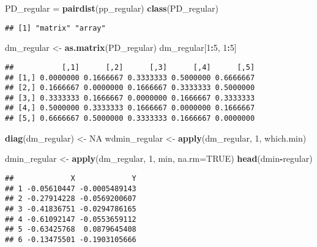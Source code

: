 \documentclass[
]{book}
\newenvironment{Shaded}{\begin{snugshade}}{\end{snugshade}}
\newcommand{\DataTypeTok}[1]{\textcolor[rgb]{0.13,0.29,0.53}{#1}}
\newcommand{\DecValTok}[1]{\textcolor[rgb]{0.00,0.00,0.81}{#1}}
\newcommand{\KeywordTok}[1]{\textcolor[rgb]{0.13,0.29,0.53}{\textbf{#1}}}
\newcommand{\NormalTok}[1]{#1}
\newcommand{\OperatorTok}[1]{\textcolor[rgb]{0.81,0.36,0.00}{\textbf{#1}}}
\newcommand{\OtherTok}[1]{\textcolor[rgb]{0.56,0.35,0.01}{#1}}
\newcommand{\StringTok}[1]{\textcolor[rgb]{0.31,0.60,0.02}{#1}}
\begin{document}
\begin{Shaded}
\begin{Highlighting}[]
\NormalTok{PD_regular =}\StringTok{ }\KeywordTok{pairdist}\NormalTok{(pp_regular)}
\KeywordTok{class}\NormalTok{(PD_regular)}
\end{Highlighting}
\end{Shaded}

\begin{verbatim}
## [1] "matrix" "array"
\end{verbatim}

\begin{Shaded}
\begin{Highlighting}[]
\NormalTok{dm_regular <-}\StringTok{ }\KeywordTok{as.matrix}\NormalTok{(PD_regular)}
\NormalTok{dm_regular[}\DecValTok{1}\OperatorTok{:}\DecValTok{5}\NormalTok{, }\DecValTok{1}\OperatorTok{:}\DecValTok{5}\NormalTok{]}
\end{Highlighting}
\end{Shaded}

\begin{verbatim}
##           [,1]      [,2]      [,3]      [,4]      [,5]
## [1,] 0.0000000 0.1666667 0.3333333 0.5000000 0.6666667
## [2,] 0.1666667 0.0000000 0.1666667 0.3333333 0.5000000
## [3,] 0.3333333 0.1666667 0.0000000 0.1666667 0.3333333
## [4,] 0.5000000 0.3333333 0.1666667 0.0000000 0.1666667
## [5,] 0.6666667 0.5000000 0.3333333 0.1666667 0.0000000
\end{verbatim}

\begin{Shaded}
\begin{Highlighting}[]
\KeywordTok{diag}\NormalTok{(dm_regular) <-}\StringTok{ }\OtherTok{NA}
\NormalTok{wdmin_regular <-}\StringTok{ }\KeywordTok{apply}\NormalTok{(dm_regular, }\DecValTok{1}\NormalTok{, which.min)}

\NormalTok{dmin_regular <-}\StringTok{ }\KeywordTok{apply}\NormalTok{(dm_regular, }\DecValTok{1}\NormalTok{, min, }\DataTypeTok{na.rm=}\OtherTok{TRUE}\NormalTok{)}
\KeywordTok{head}\NormalTok{(dmin}\OperatorTok{-}\NormalTok{regular)}
\end{Highlighting}
\end{Shaded}

\begin{verbatim}
##             X             Y
## 1 -0.05610447 -0.0005489143
## 2 -0.27914228 -0.0569200607
## 3 -0.41836751 -0.0294786165
## 4 -0.61092147 -0.0553659112
## 5 -0.63425768  0.0879645408
## 6 -0.13475501 -0.1903105666
\end{verbatim}
\end{document}

